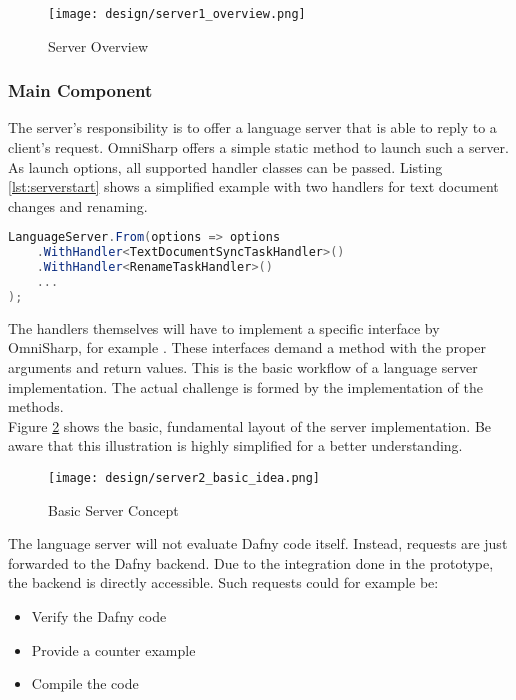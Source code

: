 \begin{figure}[ht]
    \centering
    \texttt{[image: design/server1\_overview.png]}
    \caption{Server Overview}
    \label{fig:server_overview}
\end{figure}

\subsubsection{Main Component}
The server's responsibility is to offer a language server that is able to reply to a client's request.
OmniSharp offers a simple static method to launch such a server.
As launch options, all supported handler classes can be passed.
Listing \ref{lst:serverstart} shows a simplified example with two handlers for text document changes and renaming.\\

\begin{lstlisting}[language=csharp, caption={Language Server Initialization}, captionpos=b, label={lst:serverstart}]
LanguageServer.From(options => options
    .WithHandler<TextDocumentSyncTaskHandler>()
    .WithHandler<RenameTaskHandler>()
    ...
);
\end{lstlisting}

The handlers themselves will have to implement a specific interface by OmniSharp, for example .
These interfaces demand a  method with the proper arguments and return values.
This is the basic workflow of a language server implementation.
The actual challenge is formed by the implementation of the  methods.\\

Figure \ref{fig:server_basic_idea} shows the basic, fundamental layout of the server implementation.
Be aware that this illustration is highly simplified for a better understanding.\\

\begin{figure}[ht]
    \centering
    \texttt{[image: design/server2\_basic\_idea.png]}
    \caption{Basic Server Concept}
    \label{fig:server_basic_idea}
\end{figure}

The language server will not evaluate Dafny code itself.
Instead, requests are just forwarded to the Dafny backend.
Due to the integration done in the prototype, the backend is directly accessible.
Such requests could for example be:
\begin{itemize}
    \item Verify the Dafny code
    \item Provide a counter example
    \item Compile the code
\end{itemize}

